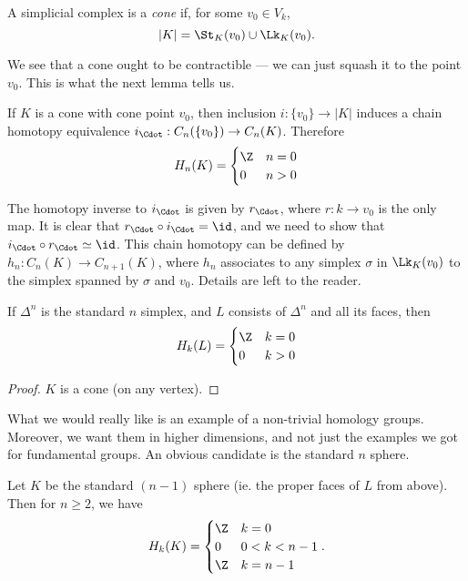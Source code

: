 \documentclass[a4paper]{article}
\begin{document}
\begin{defi}[Cone]
  A simplicial complex is a \emph{cone} if, for some $v_0 \in V_k$,
  \[
    |K| = \St_K(v_0) \cup \Lk_K(v_0).
  \]
\end{defi}
\begin{center}
\end{center}
We see that a cone ought to be contractible --- we can just squash it to the point $v_0$. This is what the next lemma tells us.
\begin{lemma}
  If $K$ is a cone with cone point $v_0$, then inclusion $i: \{v_0\} \to |K|$ induces a chain homotopy equivalence $i_{\Cdot}: C_n (\{v_0\}) \to C_n(K)$. Therefore
  \[
    H_n(K) =
    \begin{cases}
      \Z & n = 0\\
      0 & n > 0
    \end{cases}
  \]
\end{lemma}
The homotopy inverse to $i_{\Cdot}$ is given by $r_{\Cdot}$, where $r: k \to v_0$ is the only map. It is clear that $r_{\Cdot} \circ i_{\Cdot} = \id$, and we need to show that $i_{\Cdot} \circ r_{\Cdot} \simeq \id$. This chain homotopy can be defined by $h_n: C_n(K) \to C_{n + 1}(K)$, where $h_n$ associates to any simplex $\sigma$ in $\Lk_K(v_0)$ to the simplex spanned by $\sigma$ and $v_0$. Details are left to the reader.

\begin{cor}
  If $\Delta^n$ is the standard $n$ simplex, and $L$ consists of $\Delta^n$ and all its faces, then
  \[
    H_k(L) =
    \begin{cases}
      \Z & k = 0\\
      0 & k > 0
    \end{cases}
  \]
\end{cor}

\begin{proof}
  $K$ is a cone (on any vertex).
\end{proof}

What we would really like is an example of a non-trivial homology groups. Moreover, we want them in higher dimensions, and not just the examples we got for fundamental groups. An obvious candidate is the standard $n$ sphere.
\begin{cor}
  Let $K$ be the standard $(n - 1)$ sphere (ie. the proper faces of $L$ from above). Then for $n \geq 2$, we have
  \[
    H_k(K) =
    \begin{cases}
      \Z & k = 0\\
      0 & 0 < k < n - 1\\
      \Z & k = n - 1
    \end{cases}.
  \]
\end{cor}
\end{document}
